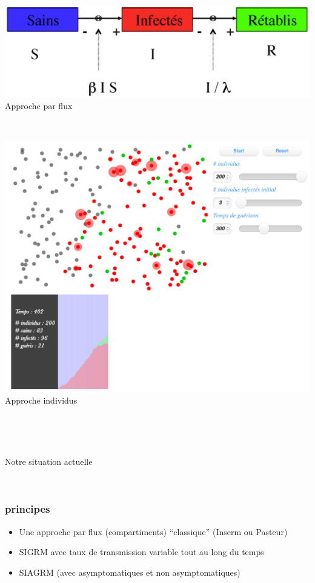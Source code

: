 \documentclass[a4paper]{cours-bdd}
\begin{document}
\begin{frame}[fragile]
  \begin{minipage}[t]{0.45\columnwidth}
        \vspace{0.0cm}
        \includegraphics[width=\linewidth]{modeleSIR.png} \\
        Approche par flux
  \end{minipage}
  \hfill \
  \begin{minipage}[t]{0.45\columnwidth}
        \vspace{0.0cm}
        \includegraphics[width=0.6\linewidth]{approcheSMA.png} \\
        Approche individus
  \end{minipage}
  \
  
\end{frame}



\begin{frame}
  \hfill \
  \begin{center}
    \Huge
    Notre situation actuelle
  \end{center}
  \hfill \

\end{frame}




\begin{frame}[fragile]
  \frametitle{principes}
  \begin{itemize}
  \item Une approche par flux (compartiments) ``classique'' (Inserm ou Pasteur)
  \item SIGRM avec taux de transmission variable tout au long du temps
  \item SIAGRM (avec asymptomatiques et non asymptomatiques)
  \end{itemize}
  
\end{frame}
\end{document}
